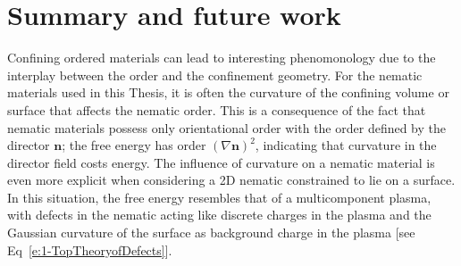 \chapter{Summary and future work}
Confining ordered materials can lead to interesting phenomonology due to the interplay between the order and the confinement geometry.
For the nematic materials used in this Thesis, it is often the curvature of the confining volume or surface that affects the nematic order.
This is a consequence of the fact that nematic materials possess only orientational order with the order defined by the director $\mathbf{n}$; the free energy has order $(\nabla \mathbf{n})^2$, indicating that curvature in the director field costs energy.
The influence of curvature on a nematic material is even more explicit when considering a 2D nematic constrained to lie on a surface.
In this situation, the free energy resembles that of a multicomponent plasma, with defects in the nematic acting like discrete charges in the plasma and the Gaussian curvature of the surface as background charge in the plasma  [see Eq~\ref{e:1-TopTheoryofDefects}].
